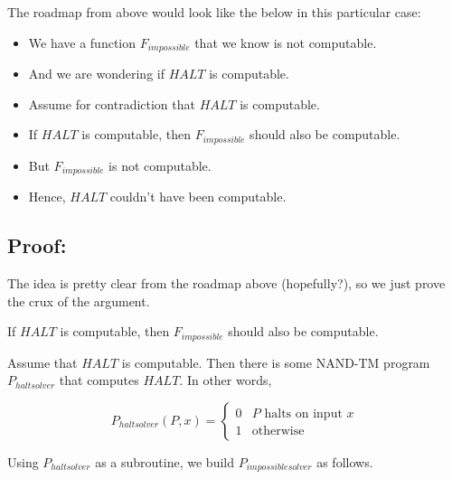\documentclass[11pt]{article}
\theoremstyle{definition}
\theoremstyle{remark}
\begin{document}
The roadmap from above would look like the below in this particular case:

\begin{itemize}
    \item{
            We have a function $F_{impossible}$ that we know is not computable.
        }
    \item{
            And we are wondering if $HALT$ is computable.
        }
    \item{
            Assume for contradiction that $HALT$ is computable.
        }
    \item{
            If $HALT$ is computable, then $F_{impossible}$ should also be computable.
        }
    \item{
            But $F_{impossible}$ is not computable.
        }
    \item{
            Hence, $HALT$ couldn't have been computable.
        }
\end{itemize}

\subsection{Proof:}

\proof The idea is pretty clear from the roadmap above (hopefully?), so we just prove the crux of the argument.

\begin{center}
     If $HALT$ is computable, then $F_{impossible}$ should also be computable.
 \end{center}
 
Assume that $HALT$ is computable. Then there is some NAND-TM program $P_{haltsolver}$ that computes $HALT$. In other words,

   \begin{equation*}
       P_{haltsolver}(P, x) = \begin{cases}
            0 & \text{$P$ halts on input $x$} \\
            1 & \text{otherwise}
        \end{cases}
    \end{equation*}

    Using $P_{haltsolver}$ as a subroutine, we build $P_{impossiblesolver}$ as follows.
\end{document}

